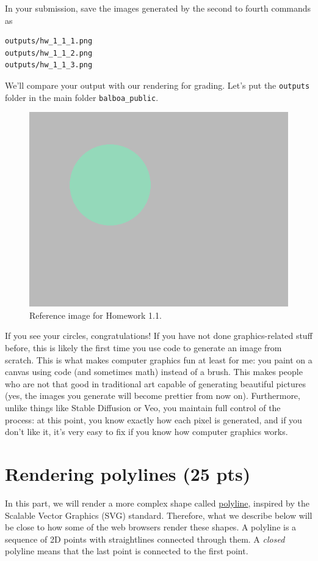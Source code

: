 In your submission, save the images generated by the second to fourth commands as
\begin{lstlisting}[language=bash]
outputs/hw_1_1_1.png
outputs/hw_1_1_2.png
outputs/hw_1_1_3.png
\end{lstlisting}
We'll compare your output with our rendering for grading.
Let's put the \lstinline{outputs} folder in the main folder \lstinline{balboa_public}.

\begin{figure}[ht]
    \centering
    \includegraphics[width=0.5\linewidth]{imgs/hw_1_1.png}
    \caption{Reference image for Homework 1.1.}
    \label{fig:hw1_1}
\end{figure}

If you see your circles, congratulations! If you have not done graphics-related stuff before, this is likely the first time you use code to generate an image from scratch. This is what makes computer graphics fun at least for me: you paint on a canvas using code (and sometimes math) instead of a brush. This makes people who are not that good in traditional art capable of generating beautiful pictures (yes, the images you generate will become prettier from now on). Furthermore, unlike things like Stable Diffusion or Veo, you maintain full control of the process: at this point, you know exactly how each pixel is generated, and if you don't like it, it's very easy to fix if you know how computer graphics works.

\section{Rendering polylines (25 pts)}

In this part, we will render a more complex shape called \href{https://developer.mozilla.org/en-US/docs/Web/SVG/Reference/Element/polyline}{polyline}, inspired by the Scalable Vector Graphics (SVG) standard. 
Therefore, what we describe below will be close to how some of the web browsers render these shapes. 
A polyline is a sequence of 2D points with straightlines connected through them. A \emph{closed} polyline means that the last point is connected to the first point.

